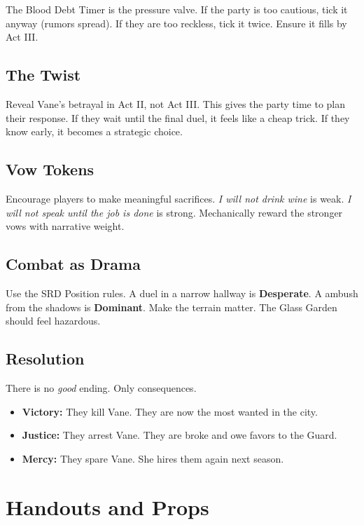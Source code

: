 \documentclass[12pt]{book}
\begin{document}
The Blood Debt Timer is the pressure valve. If the party is too cautious, tick it anyway (rumors spread). If they are too reckless, tick it twice. Ensure it fills by Act III.

\section{The Twist}

Reveal Vane's betrayal in Act II, not Act III. This gives the party time to plan their response. If they wait until the final duel, it feels like a cheap trick. If they know early, it becomes a strategic choice.

\section{Vow Tokens}

Encourage players to make meaningful sacrifices. \textit{I will not drink wine} is weak. \textit{I will not speak until the job is done} is strong. Mechanically reward the stronger vows with narrative weight.

\section{Combat as Drama}

Use the SRD Position rules. A duel in a narrow hallway is \textbf{Desperate}. A ambush from the shadows is \textbf{Dominant}. Make the terrain matter. The Glass Garden should feel hazardous.

\section{Resolution}

There is no \textit{good} ending. Only consequences.
\begin{itemize}
    \item \textbf{Victory:} They kill Vane. They are now the most wanted in the city.
    \item \textbf{Justice:} They arrest Vane. They are broke and owe favors to the Guard.
    \item \textbf{Mercy:} They spare Vane. She hires them again next season.
\end{itemize}

\chapter{Handouts and Props}
\end{document}
